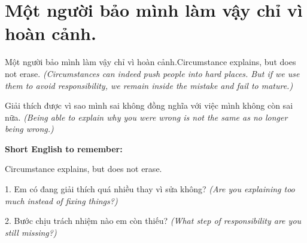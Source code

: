 \section{Một người bảo mình làm vậy chỉ vì hoàn cảnh.}
\begin{truyen}{Một người bảo mình làm vậy chỉ vì hoàn cảnh.}{Circumstance explains, but does not erase.}
\textit{(Circumstances can indeed push people into hard places. But if we use them to avoid responsibility, we remain inside the mistake and fail to mature.)}
\end{truyen}
\begin{baihoc}
Giải thích được vì sao mình sai không đồng nghĩa với việc mình không còn sai nữa.
\textit{(Being able to explain why you were wrong is not the same as no longer being wrong.)}
\end{baihoc}
\begin{ghinhoanh}\textbf{Short English to remember:}

Circumstance explains, but does not erase.
\end{ghinhoanh}
\begin{tuhocnhanh}
1. Em có đang giải thích quá nhiều thay vì sửa không? \textit{(Are you explaining too much instead of fixing things?)}

2. Bước chịu trách nhiệm nào em còn thiếu? \textit{(What step of responsibility are you still missing?)}
\end{tuhocnhanh}
\ngancach

